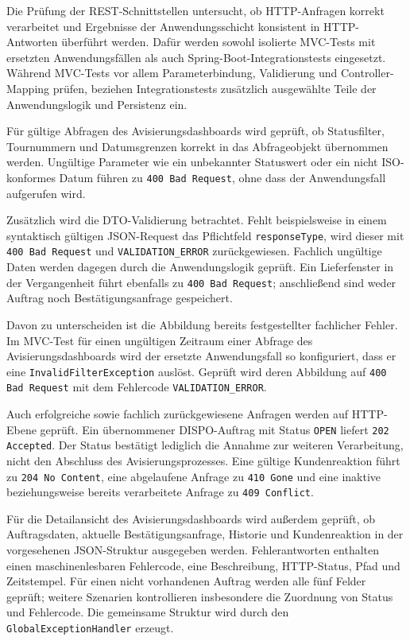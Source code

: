 \documentclass[
  12pt,
  a4paper,
  oneside
]{article}
\begin{document}
Die Prüfung der REST-Schnittstellen untersucht, ob HTTP-Anfragen korrekt
verarbeitet und Ergebnisse der Anwendungsschicht konsistent in HTTP-Antworten
überführt werden. Dafür werden sowohl isolierte MVC-Tests mit ersetzten
Anwendungsfällen als auch Spring-Boot-Integrationstests eingesetzt. Während
MVC-Tests vor allem Parameterbindung, Validierung und Controller-Mapping prüfen,
beziehen Integrationstests zusätzlich ausgewählte Teile der Anwendungslogik und
Persistenz ein.

Für gültige Abfragen des Avisierungsdashboards wird geprüft, ob Statusfilter,
Tournummern und Datumsgrenzen korrekt in das Abfrageobjekt übernommen werden.
Ungültige Parameter wie ein unbekannter Statuswert oder ein nicht ISO-konformes
Datum führen zu \texttt{400 Bad Request}, ohne dass der Anwendungsfall
aufgerufen wird.

Zusätzlich wird die DTO-Validierung betrachtet. Fehlt beispielsweise in einem
syntaktisch gültigen JSON-Request das Pflichtfeld \texttt{responseType}, wird
dieser mit \texttt{400 Bad Request} und \texttt{VALIDATION\_ERROR}
zurückgewiesen. Fachlich ungültige Daten werden dagegen durch die
Anwendungslogik geprüft. Ein Lieferfenster in der Vergangenheit führt ebenfalls
zu \texttt{400 Bad Request}; anschließend sind weder Auftrag noch
Bestätigungsanfrage gespeichert.

Davon zu unterscheiden ist die Abbildung bereits festgestellter fachlicher
Fehler. Im MVC-Test für einen ungültigen Zeitraum einer Abfrage des
Avisierungsdashboards wird der ersetzte Anwendungsfall so konfiguriert, dass er
eine \texttt{InvalidFilterException} auslöst. Geprüft wird deren Abbildung auf
\texttt{400 Bad Request} mit dem Fehlercode \texttt{VALIDATION\_ERROR}.

Auch erfolgreiche sowie fachlich zurückgewiesene Anfragen werden auf HTTP-Ebene
geprüft. Ein übernommener DISPO-Auftrag mit Status \texttt{OPEN} liefert
\texttt{202 Accepted}. Der Status bestätigt lediglich die Annahme zur weiteren
Verarbeitung, nicht den Abschluss des Avisierungsprozesses. Eine gültige
Kundenreaktion führt zu \texttt{204 No Content}, eine abgelaufene Anfrage zu
\texttt{410 Gone} und eine inaktive beziehungsweise bereits verarbeitete
Anfrage zu \texttt{409 Conflict}.

Für die Detailansicht des Avisierungsdashboards wird außerdem geprüft, ob
Auftragsdaten, aktuelle Bestätigungsanfrage, Historie und Kundenreaktion in
der vorgesehenen JSON-Struktur ausgegeben werden. Fehlerantworten enthalten einen
maschinenlesbaren Fehlercode, eine Beschreibung, HTTP-Status, Pfad und
Zeitstempel. Für einen nicht vorhandenen Auftrag werden alle fünf Felder
geprüft; weitere Szenarien kontrollieren insbesondere die Zuordnung von Status
und Fehlercode. Die gemeinsame Struktur wird durch den
\texttt{GlobalExceptionHandler} erzeugt.
\end{document}
